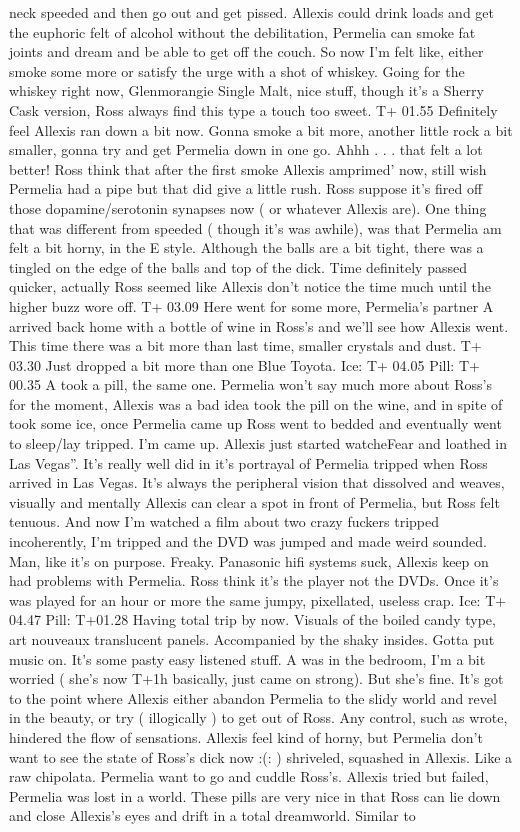 \documentclass[12pt]{book}
\begin{document}
neck speeded and then go out and get pissed. Allexis could drink loads and get the euphoric felt of alcohol without the debilitation, Permelia can smoke fat joints and dream and be able to get off the couch. So now I'm felt like, either smoke some more or satisfy the urge with a shot of whiskey. Going for the whiskey right now, Glenmorangie Single Malt, nice stuff, though it's a Sherry Cask version, Ross always find this type a touch too sweet. T+ 01.55 Definitely feel Allexis ran down a bit now. Gonna smoke a bit more, another little rock a bit smaller, gonna try and get Permelia down in one go. Ahhh . . .  that felt a lot better! Ross think that after the first smoke Allexis amprimed' now, still wish Permelia had a pipe but that did give a little rush. Ross suppose it's fired off those dopamine/serotonin synapses now ( or whatever Allexis are). One thing that was different from speeded ( though it's was awhile), was that Permelia am felt a bit horny, in the E style. Although the balls are a bit tight, there was a tingled on the edge of the balls and top of the dick. Time definitely passed quicker, actually Ross seemed like Allexis don't notice the time much until the higher buzz wore off. T+ 03.09 Here went for some more, Permelia's partner A arrived back home with a bottle of wine in Ross's and we'll see how Allexis went. This time there was a bit more than last time, smaller crystals and dust. T+ 03.30 Just dropped a bit more than one Blue Toyota. Ice: T+ 04.05 Pill: T+ 00.35 A took a pill, the same one. Permelia won't say much more about Ross's for the moment, Allexis was a bad idea took the pill on the wine, and in spite of took some ice, once Permelia came up Ross went to bedded and eventually went to sleep/lay tripped. I'm came up. Allexis just started watcheFear and loathed in Las Vegas''. It's really well did in it's portrayal of Permelia tripped when Ross arrived in Las Vegas. It's always the peripheral vision that dissolved and weaves, visually and mentally Allexis can clear a spot in front of Permelia, but Ross felt tenuous. And now I'm watched a film about two crazy fuckers tripped incoherently, I'm tripped and the DVD was jumped and made weird sounded. Man, like it's on purpose. Freaky. Panasonic hifi systems suck, Allexis keep on had problems with Permelia. Ross think it's the player not the DVDs. Once it's was played for an hour or more the same jumpy, pixellated, useless crap. Ice: T+ 04.47 Pill: T+01.28 Having total trip by now. Visuals of the boiled candy type, art nouveaux translucent panels. Accompanied by the shaky insides. Gotta put music on. It's some pasty easy listened stuff. A was in the bedroom, I'm a bit worried ( she's now T+1h basically, just came on strong). But she's fine. It's got to the point where Allexis either abandon Permelia to the slidy world and revel in the beauty, or try ( illogically ) to get out of Ross. Any control, such as wrote, hindered the flow of sensations. Allexis feel kind of horny, but Permelia don't want to see the state of Ross's dick now :(: ) shriveled, squashed in Allexis. Like a raw chipolata. Permelia want to go and cuddle Ross's. Allexis tried but failed, Permelia was lost in a world. These pills are very nice in that Ross can lie down and close Allexis's eyes and drift in a total dreamworld. Similar to 
\end{document}
